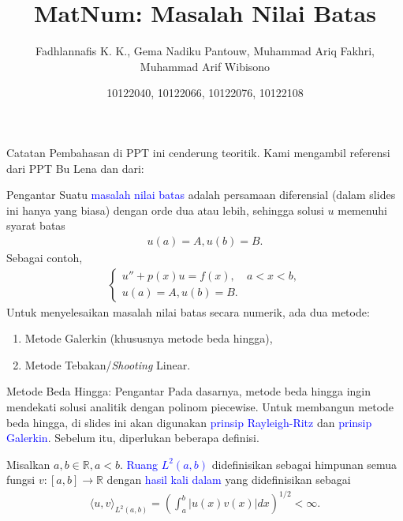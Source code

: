 \documentclass[xcolor={dvipsnames}, 9pt]{beamer}
\title{MatNum: Masalah Nilai Batas}
\author{Fadhlannafis K. K., Gema Nadiku Pantouw, Muhammad Ariq Fakhri, Muhammad Arif Wibisono}
\date{10122040, 10122066, 10122076, 10122108}
\renewcommand{\emph}[1]{\textcolor{Blue}{#1}}
\begin{document}
	\begin{frame}[plain]
		\maketitle
	\end{frame}
	\begin{frame}{Catatan}
		Pembahasan di PPT ini cenderung teoritik. Kami mengambil referensi dari PPT Bu Lena dan dari:
		\nocite{*}
		\printbibliography
	\end{frame}
	\begin{frame}{Pengantar}
		Suatu \emph{masalah nilai batas} adalah persamaan diferensial (dalam slides ini hanya yang biasa) dengan orde dua atau lebih, sehingga solusi $u$ memenuhi syarat batas
		\begin{align*}
			u(a) = A, u(b) = B.
		\end{align*}
		Sebagai contoh,
		\begin{align*}
			\begin{cases}
				u'' + p(x)u = f(x), & a<x<b, \\
				u(a) = A, u(b) = B.
			\end{cases}
		\end{align*}
		Untuk menyelesaikan masalah nilai batas secara numerik, ada dua metode:
		\begin{enumerate}
			\item Metode Galerkin (khususnya metode beda hingga),
			\item Metode Tebakan/\textit{Shooting} Linear.
		\end{enumerate}
	\end{frame}
	\begin{frame}{Metode Beda Hingga: Pengantar}
		Pada dasarnya, metode beda hingga ingin mendekati solusi analitik dengan polinom piecewise. Untuk membangun metode beda hingga, di slides ini akan digunakan \emph{prinsip Rayleigh-Ritz} dan \emph{prinsip Galerkin}. Sebelum itu, diperlukan beberapa definisi. \par
		\begin{definition}[Ruang $L^2$]
			Misalkan $a,b\in\mathbb{R}, a<b$. \emph{Ruang $L^2(a,b)$} didefinisikan sebagai himpunan semua fungsi $v:[a,b]\to\mathbb{R}$ dengan \emph{hasil kali dalam} yang didefinisikan sebagai
			\begin{align*}
				\langle u,v\rangle_{L^2(a,b)} = \left(\int_{a}^{b} |u(x)v(x)| dx\right)^{1/2} < \infty.
			\end{align*}
		\end{definition}
	\end{frame}
\end{document}

